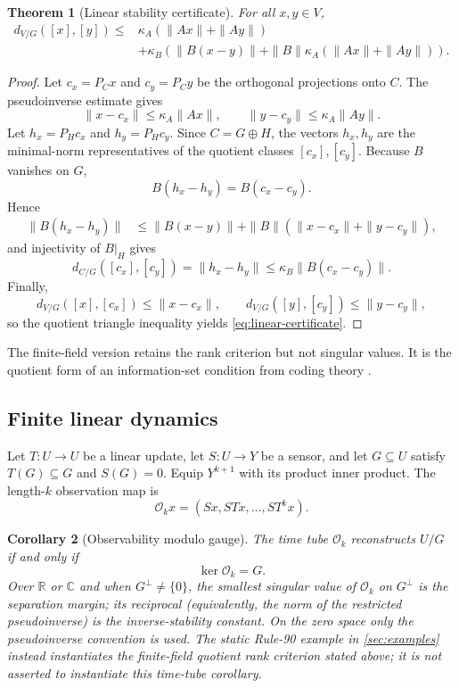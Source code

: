 \documentclass[11pt]{article}
\newtheorem{theorem}{Theorem}[section]
\newtheorem{corollary}[theorem]{Corollary}
\theoremstyle{definition}
\theoremstyle{remark}
\numberwithin{equation}{section}
\begin{document}
\begin{theorem}[Linear stability certificate]\label{thm:linear-certificate}
For all $x,y\in V$,
\begin{equation}\label{eq:linear-certificate}
\begin{split}
 d_{V/G}([x],[y])\le{}&
 \kappa_A(\|Ax\|+\|Ay\|)\\
 &+\kappa_B\!\left(
 \|B(x-y)\|+
 \|B\|\kappa_A(\|Ax\|+\|Ay\|)
 \right).
\end{split}
\end{equation}
\end{theorem}

\begin{proof}
Let $c_x=P_Cx$ and $c_y=P_Cy$ be the orthogonal projections onto $C$.  The pseudoinverse estimate gives
\[
 \|x-c_x\|\le\kappa_A\|Ax\|,
 \qquad
 \|y-c_y\|\le\kappa_A\|Ay\|.
\]
Let $h_x=P_Hc_x$ and $h_y=P_Hc_y$.  Since $C=G\oplus H$, the vectors $h_x,h_y$ are the minimal-norm representatives of the quotient classes $[c_x],[c_y]$.  Because $B$ vanishes on $G$,
\[
 B(h_x-h_y)=B(c_x-c_y).
\]
Hence
\begin{align*}
 \|B(h_x-h_y)\|
 &\le \|B(x-y)\|+\|B\|(\|x-c_x\|+\|y-c_y\|),
\end{align*}
and injectivity of $B|_H$ gives
\[
 d_{C/G}([c_x],[c_y])=\|h_x-h_y\|
 \le\kappa_B\|B(c_x-c_y)\|.
\]
Finally,
\[
 d_{V/G}([x],[c_x])\le\|x-c_x\|,
 \qquad
 d_{V/G}([y],[c_y])\le\|y-c_y\|,
\]
so the quotient triangle inequality yields \eqref{eq:linear-certificate}.
\end{proof}

The finite-field version retains the rank criterion but not singular values.  It is the quotient form of an information-set condition from coding theory \citep{HuffmanPless2003}.

\subsection{Finite linear dynamics}

Let $T:U\to U$ be a linear update, let $S:U\to Y$ be a sensor, and let
$G\subseteq U$ satisfy $T(G)\subseteq G$ and $S(G)=0$.  Equip
$Y^{k+1}$ with its product inner product.  The length-$k$ observation map is
\[
 \mathcal O_kx=(Sx,STx,\ldots,ST^kx).
\]

\begin{corollary}[Observability modulo gauge]\label{cor:observability}
The time tube $\mathcal O_k$ reconstructs $U/G$ if and only if
\[
 \ker\mathcal O_k=G.
\]
Over $\mathbb R$ or $\mathbb C$ and when $G^\perp\ne\{0\}$, the smallest
singular value of $\mathcal O_k$ on $G^\perp$ is the separation margin; its
reciprocal (equivalently, the norm of the restricted pseudoinverse) is the
inverse-stability constant.  On the zero space only the pseudoinverse
convention is used.  The static Rule-90 example
in \cref{sec:examples} instead instantiates the finite-field quotient
rank criterion stated above; it is not asserted to instantiate this time-tube corollary.
\end{corollary}
\end{document}
